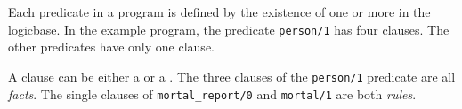 Each predicate in a program is defined by the existence of one or more
 in the logicbase. In the example program, the
predicate \verb'person/1' has four clauses. The other predicates have only one
clause.

A clause can be either a  or a
. The three clauses of the \verb'person/1' predicate
are all \emph{facts}. The single clauses of \verb|mortal_report/0| and
\verb|mortal/1| are both \emph{rules}.

\secup
